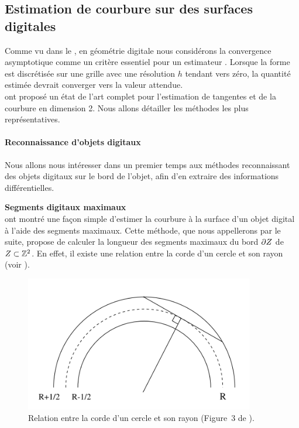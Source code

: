\subsection{Estimation de courbure sur des surfaces digitales}
%
Comme vu dans le , en géométrie digitale nous
considérons la convergence asymptotique comme un critère essentiel pour un
estimateur \cite{Klette2000}. Lorsque la forme est discrétisée
sur une grille avec une résolution $h$ tendant vers zéro, la quantité estimée
devrait converger vers la valeur attendue.
%
\\
%
 ont proposé un état de l'art
complet pour l'estimation de tangentes et de la courbure en dimension 2. Nous
allons détailler les méthodes les plus représentatives.
%
\paragraph{Reconnaissance d'objets digitaux}
%
Nous allons nous intéresser dans un premier temps aux méthodes reconnaissant des
objets digitaux sur le bord de l'objet, afin d'en extraire des informations
différentielles.


\textbf{Segments digitaux maximaux}\\
 ont montré une façon simple d'estimer
la courbure à la surface d'un objet digital à l'aide des segments maximaux.
Cette méthode, que nous appellerons \MDSS par le suite, propose de calculer la
longueur des segments maximaux du bord $\partial Z$ de $Z
\subset \mathbb{Z}^2$. En effet, il existe une relation entre la corde d'un cercle et
son rayon (voir ).

\begin{figure}[ht]{
    \begin{center}
    \includegraphics[width=10cm]{images/Notions/MDSS1}
    \end{center}}
    \caption[Relation entre la corde d'un cercle et son rayon.]{Relation entre la corde d'un cercle et son rayon (Figure~3 de \cite{Coeurjolly2001}). \label{fig:mdss-chord}}
\end{figure}

